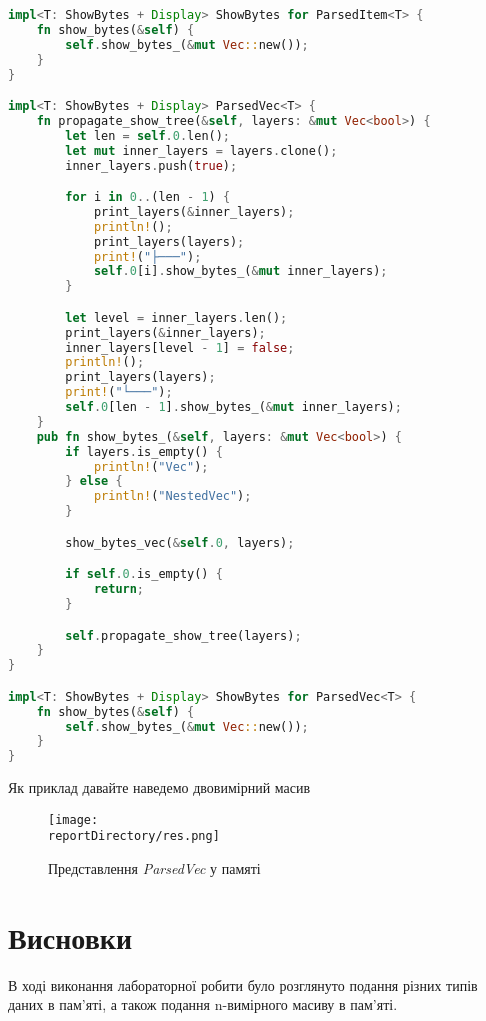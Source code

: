 \begin{lstlisting}[language=Rust, style=colouredRust]
impl<T: ShowBytes + Display> ShowBytes for ParsedItem<T> {
    fn show_bytes(&self) {
        self.show_bytes_(&mut Vec::new());
    }
}

impl<T: ShowBytes + Display> ParsedVec<T> {
    fn propagate_show_tree(&self, layers: &mut Vec<bool>) {
        let len = self.0.len();
        let mut inner_layers = layers.clone();
        inner_layers.push(true);

        for i in 0..(len - 1) {
            print_layers(&inner_layers);
            println!();
            print_layers(layers);
            print!("├───");
            self.0[i].show_bytes_(&mut inner_layers);
        }

        let level = inner_layers.len();
        print_layers(&inner_layers);
        inner_layers[level - 1] = false;
        println!();
        print_layers(layers);
        print!("└───");
        self.0[len - 1].show_bytes_(&mut inner_layers);
    }
    pub fn show_bytes_(&self, layers: &mut Vec<bool>) {
        if layers.is_empty() {
            println!("Vec");
        } else {
            println!("NestedVec");
        }

        show_bytes_vec(&self.0, layers);

        if self.0.is_empty() {
            return;
        }

        self.propagate_show_tree(layers);
    }
}

impl<T: ShowBytes + Display> ShowBytes for ParsedVec<T> {
    fn show_bytes(&self) {
        self.show_bytes_(&mut Vec::new());
    }
}
\end{lstlisting}

\newpage
\noindent
Як приклад давайте наведемо двовимірний масив
\begin{figure}[h!]
    \centering
    \texttt{[image: \\reportDirectory/res.png]}
    \caption{Представлення \textit{ParsedVec} у памяті}
    \label{fig:task}
\end{figure}


\newpage
\section{Висновки}
В ході виконання лабораторної робити було розглянуто подання різних типів даних в пам'яті, а також подання n-вимірного масиву в пам'яті. 
